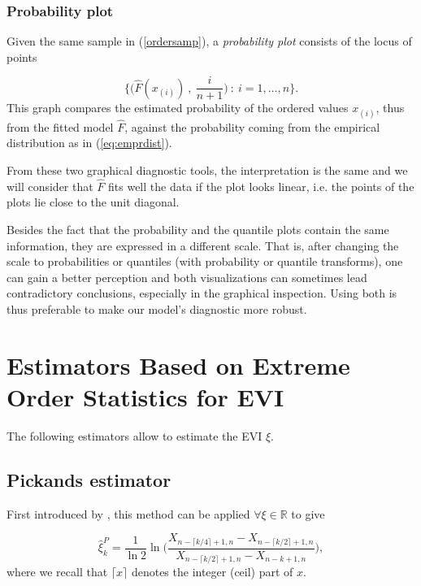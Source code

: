 \subsubsection*{Probability plot} Given the same sample in (\ref{ordersamp}), a \emph{probability plot} consists of the locus of points 

\begin{equation}
\Bigg\{\bigg(\hat{F}(x_{(i)})\ ,\ \frac{i}{n+1}\bigg) \ : \ i=1,\dots,n\Bigg\}.
\end{equation}
This graph compares the estimated probability of the ordered values $x_{(i)}$, thus from the fitted model $\hat{F}$, against the probability coming from the empirical distribution as in (\ref{eq:emprdist}). 

From these two graphical diagnostic tools, the interpretation is the same and we will consider that $\hat{F}$ fits well the data if the plot looks linear, i.e. the points of the plots lie close to the unit diagonal.

Besides the fact that the probability and the quantile plots contain the same information, they are expressed in a different scale. That is, after changing the scale to probabilities or quantiles (with probability or quantile transforms), one can gain a better perception and both visualizations can sometimes lead contradictory conclusions, especially in the graphical inspection. Using both is thus preferable to make our model's diagnostic more robust.

\section{Estimators Based on Extreme Order Statistics for EVI}\label{sec:infevi}
The following estimators allow to estimate the EVI $\xi$. 

\subsection*{Pickands estimator}


First introduced by \cite{iii_statistical_1975-1}, this method can be applied $\forall\xi\in\mathbb{R}$ to give

\begin{equation}
\hat{\xi}^P_{k}= \frac{1}{\ln 2}\ln \Bigg(\frac{X_{n-\lceil k/4\rceil +1,n}-X_{n-\lceil k/2\rceil+1,n}}{X_{n-\lceil k/2\rceil +1,n}-X_{n-k+1,n}}\Bigg),
\end{equation}
where we recall that $\lceil x\rceil$ denotes the integer (ceil) part of $x$.


